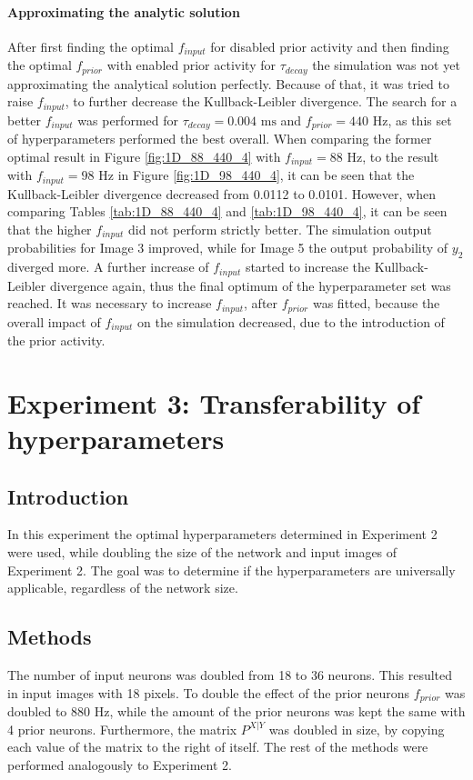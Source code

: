 \paragraph{Approximating the analytic solution}
After first finding the optimal $f_{input}$ for disabled prior activity and then finding the optimal $f_{prior}$ with enabled prior activity for $\tau_{decay}$ the simulation was not yet approximating the analytical solution perfectly. Because of that, it was tried to raise $f_{input}$, to further decrease the Kullback-Leibler divergence. The search for a better $f_{input}$ was performed for $\tau_{decay} = 0.004\text{ ms}$ and $f_{prior} = 440\text{ Hz}$, as this set of hyperparameters performed the best overall.
When comparing the former optimal result in Figure \ref{fig:1D_88_440_4} with $f_{input} = 88\text{ Hz}$, to the result with $f_{input} = 98\text{ Hz}$ in Figure \ref{fig:1D_98_440_4}, it can be seen that the Kullback-Leibler divergence decreased from 0.0112 to 0.0101. However, when comparing Tables \ref{tab:1D_88_440_4} and \ref{tab:1D_98_440_4}, it can be seen that the higher $f_{input}$ did not perform strictly better. The simulation output probabilities for Image 3 improved, while for Image 5 the output probability of $y_2$ diverged more. A further increase of $f_{input}$ started to increase the Kullback-Leibler divergence again, thus the final optimum of the hyperparameter set was reached. It was necessary to increase $f_{input}$, after $f_{prior}$ was fitted, because the overall impact of $f_{input}$ on the simulation decreased, due to the introduction of the prior activity.

\section{Experiment 3: Transferability of hyperparameters}
\label{section:1DDoubleSize}

\subsection{Introduction}
In this experiment the optimal hyperparameters determined in Experiment 2 were used, while doubling the size of the network and input images of Experiment 2. The goal was to determine if the hyperparameters are universally applicable, regardless of the network size.

\subsection{Methods}
The number of input neurons was doubled from 18 to 36 neurons. This resulted in input images with 18 pixels. To double the effect of the prior neurons $f_{prior}$ was doubled to 880 Hz, while the amount of the prior neurons was kept the same with 4 prior neurons. Furthermore, the matrix $P^{X|Y}$ was doubled in size, by copying each value of the matrix to the right of itself.  The rest of the methods were performed analogously to Experiment 2.

